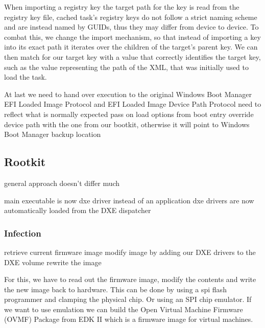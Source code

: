 

When importing a registry key the target path for the key is read from the registry key file, cached task's registry keys do not follow a strict naming scheme and are instead named by \acp{GUID}, thus they may differ from device to device. To combat this, we change the import mechanism, so that instead of importing a key into its exact path it iterates over the children of the target's parent key. We can then match for our target key with a value that correctly identifies the target key, such as the value representing the path of the \ac{XML}, that was initially used to load the task.

At last we need to hand over execution to the original Windows Boot Manager
\ac{EFI} Loaded Image Protocol \cite[9.1]{uefi-spec} and \ac{EFI} Loaded Image Device Path Protocol \cite[9.2]{uefi-spec}
need to reflect what is normally expected
pass on load options from boot entry
override device path with the one from our bootkit, otherwise it will point to Windows Boot Manager backup location


\subsection{Rootkit}

general approach doesn't differ much

main executable is now dxe driver instead of an application
dxe drivers are now automatically loaded from the DXE dispatcher

\subsubsection{Infection}

retrieve current firmware image
modify image by adding our DXE drivers to the DXE volume
rewrite the image

For this, we have to read out the firmware image, modify the contents and write the new image back to hardware. This can be done by using a spi flash programmer and clamping the physical chip. Or using an SPI chip emulator. 
If we want to use emulation we can build the Open Virtual Machine Firmware (OVMF) Package from EDK II which is a firmware image for virtual machines.

